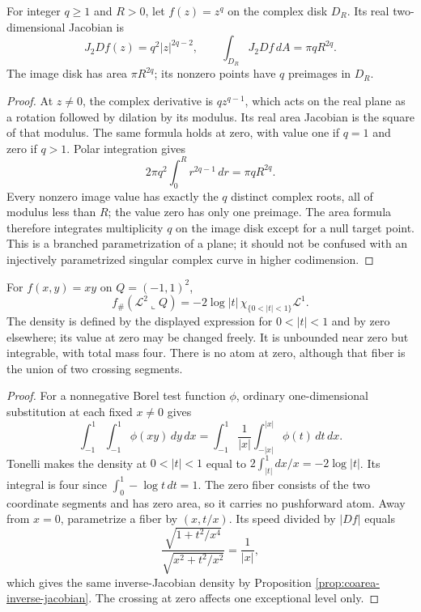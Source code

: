 \begin{example}\label{ex:area-complex-power-map}
For integer $q\geq1$ and $R>0$, let $f(z)=z^q$ on the complex disk $D_R$. Its real two-dimensional Jacobian is
\[
 J_2Df(z)=q^2|z|^{2q-2},
 \qquad \int_{D_R}J_2Df\,dA=\pi qR^{2q}.
\]
The image disk has area $\pi R^{2q}$; its nonzero points have $q$ preimages in $D_R$.
\end{example}
\begin{proof}
At $z\ne0$, the complex derivative is $qz^{q-1}$, which acts on the real plane as a rotation followed by dilation by its modulus. Its real area Jacobian is the square of that modulus. The same formula holds at zero, with value one if $q=1$ and zero if $q>1$. Polar integration gives
\[
 2\pi q^2\int_0^Rr^{2q-1}\,dr=\pi qR^{2q}.
\]
Every nonzero image value has exactly the $q$ distinct complex roots, all of modulus less than $R$; the value zero has only one preimage. The area formula therefore integrates multiplicity $q$ on the image disk except for a null target point. This is a branched parametrization of a plane; it should not be confused with an injectively parametrized singular complex curve in higher codimension.
\end{proof}

\begin{example}\label{ex:coarea-product-log-density}
For $f(x,y)=xy$ on $Q=(-1,1)^2$,
\[
 f_\#(\mathcal L^2\llcorner Q)
 =-2\log|t|\,\chi_{\{0<|t|<1\}}\mathcal L^1.
\]
The density is defined by the displayed expression for $0<|t|<1$ and by zero elsewhere; its value at zero may be changed freely. It is unbounded near zero but integrable, with total mass four. There is no atom at zero, although that fiber is the union of two crossing segments.
\end{example}
\begin{proof}
For a nonnegative Borel test function $\phi$, ordinary one-dimensional substitution at each fixed $x\ne0$ gives
\[
 \int_{-1}^1\int_{-1}^1\phi(xy)\,dy\,dx
 =\int_{-1}^1\frac1{|x|}\int_{-|x|}^{|x|}\phi(t)\,dt\,dx.
\]
Tonelli makes the density at $0<|t|<1$ equal to $2\int_{|t|}^1dx/x=-2\log|t|$. Its integral is four since $\int_0^1-\log t\,dt=1$. The zero fiber consists of the two coordinate segments and has zero area, so it carries no pushforward atom. Away from $x=0$, parametrize a fiber by $(x,t/x)$. Its speed divided by $|Df|$ equals
\[
 \frac{\sqrt{1+t^2/x^4}}{\sqrt{x^2+t^2/x^2}}=\frac1{|x|},
\]
which gives the same inverse-Jacobian density by Proposition \ref{prop:coarea-inverse-jacobian}. The crossing at zero affects one exceptional level only.
\end{proof}

